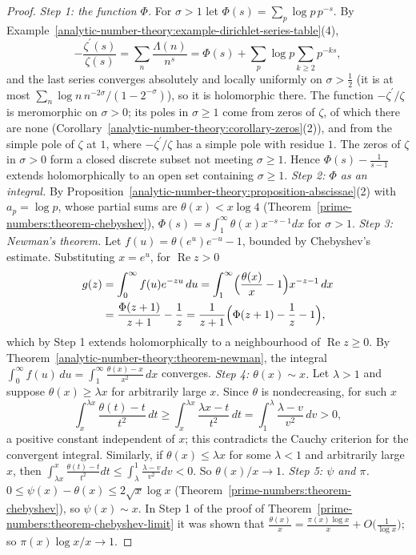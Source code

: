 \begin{proof}
\emph{Step 1: the function $\Phi$.} For $\sigma > 1$ let $\Phi(s) = \sum_p\log p\,p^{-s}$. By Example~\ref{analytic-number-theory:example-dirichlet-series-table}(4),
\[
-\frac{\zeta^{\prime}(s)}{\zeta(s)} = \sum_n\frac{\Lambda(n)}{n^s} = \Phi(s) + \sum_p\log p\sum_{k \geq 2}p^{-ks},
\]
and the last series converges absolutely and locally uniformly on $\sigma > \frac12$ (it is at most $\sum_n\log n\,n^{-2\sigma}/(1 - 2^{-\sigma})$), so it is holomorphic there. The function
$-\zeta^{\prime}/\zeta$ is meromorphic on $\sigma > 0$; its poles in $\sigma \geq 1$ come from zeros of $\zeta$, of which there are none (Corollary~\ref{analytic-number-theory:corollary-zeros}(2)), and from
the simple pole of $\zeta$ at $1$, where $-\zeta^{\prime}/\zeta$ has a simple pole with residue $1$. The zeros of $\zeta$ in $\sigma > 0$ form a closed discrete subset not meeting $\sigma \geq 1$. Hence
$\Phi(s) - \frac{1}{s - 1}$ extends holomorphically to an open set containing $\sigma \geq 1$.
\emph{Step 2: $\Phi$ as an integral.} By Proposition~\ref{analytic-number-theory:proposition-abscissae}(2) with $a_p = \log p$, whose partial sums are $\theta(x) < x\log 4$
(Theorem~\ref{prime-numbers:theorem-chebyshev}), $\Phi(s) = s\int_1^\infty\theta(x)x^{-s-1}dx$ for $\sigma > 1$.
\emph{Step 3: Newman's theorem.} Let $f(u) = \theta(e^u)e^{-u} - 1$, bounded by Chebyshev's estimate. Substituting $x = e^u$, for $\operatorname{Re}z > 0$
\[
\begin{aligned}
g(z) &= \int_0^\infty f(u)e^{-zu}\,du = \int_1^\infty\Bigl(\frac{\theta(x)}{x} - 1\Bigr)x^{-z-1}\,dx \\
&= \frac{\Phi(z + 1)}{z + 1} - \frac1z = \frac{1}{z + 1}\Bigl(\Phi(z + 1) - \frac1z - 1\Bigr),
\end{aligned}
\]
which by Step 1 extends holomorphically to a neighbourhood of $\operatorname{Re}z \geq 0$. By Theorem~\ref{analytic-number-theory:theorem-newman}, the integral
$\int_0^\infty f(u)\,du = \int_1^\infty\frac{\theta(x) - x}{x^2}\,dx$ converges.
\emph{Step 4: $\theta(x) \sim x$.} Let $\lambda > 1$ and suppose $\theta(x) \geq \lambda x$ for arbitrarily large $x$. Since $\theta$ is nondecreasing, for such $x$
\[
\int_x^{\lambda x}\frac{\theta(t) - t}{t^2}\,dt \geq \int_x^{\lambda x}\frac{\lambda x - t}{t^2}\,dt = \int_1^\lambda\frac{\lambda - v}{v^2}\,dv > 0,
\]
a positive constant independent of $x$; this contradicts the Cauchy criterion for the convergent integral. Similarly, if $\theta(x) \leq \lambda x$ for some $\lambda < 1$ and arbitrarily large $x$,
then $\int_{\lambda x}^x\frac{\theta(t) - t}{t^2}dt \leq \int_\lambda^1\frac{\lambda - v}{v^2}dv < 0$. So $\theta(x)/x \to 1$.
\emph{Step 5: $\psi$ and $\pi$.} $0 \leq \psi(x) - \theta(x) \leq 2\sqrt{x}\log x$ (Theorem~\ref{prime-numbers:theorem-chebyshev}), so $\psi(x) \sim x$. In Step 1 of the proof of
Theorem~\ref{prime-numbers:theorem-chebyshev-limit} it was shown that $\frac{\theta(x)}{x} = \frac{\pi(x)\log x}{x} + O\bigl(\frac{1}{\log x}\bigr)$; so $\pi(x)\log x/x \to 1$.
\end{proof}

